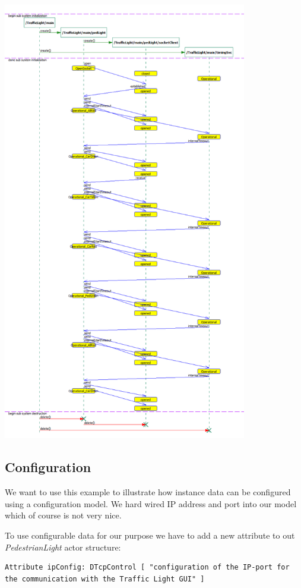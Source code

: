 \includegraphics[width=0.8\textwidth]{images/018-msc.png}

\subsection{Configuration}

We want to use this example to illustrate how instance data can be configured using a configuration model.
We hard wired IP address and port into our model which of course is not very nice.

To use configurable data for our purpose we have to add a new attribute to out \textit{PedestrianLight} actor structure:

\begin{lstlisting}[language=ROOM]
Attribute ipConfig: DTcpControl [ "configuration of the IP-port for the communication with the Traffic Light GUI" ]
\end{lstlisting}


